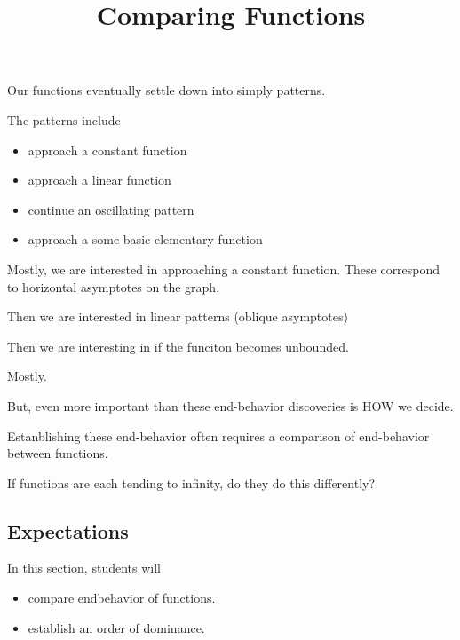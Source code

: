 \documentclass{ximera}
\title{Comparing Functions}
\begin{document}
\begin{abstract}
\end{abstract}
\maketitle







Our functions eventually settle down into simply patterns.  

The patterns include

\begin{itemize}
\item approach a constant function
\item approach a linear function
\item continue an oscillating pattern
\item approach a some basic elementary function 
\end{itemize}


Mostly, we are interested in approaching a constant function.  These correspond to horizontal asymptotes on the graph.

Then we are interested in linear patterns (oblique asymptotes)

Then we are interesting in if the funciton becomes unbounded.

Mostly.


But, even more important than these end-behavior discoveries is HOW we decide.

Estanblishing these end-behavior often requires a comparison of end-behavior between functions.  


If functions are each tending to infinity, do they do this differently?


















\subsection{Expectations}


\begin{sectionOutcomes}
In this section, students will 

\begin{itemize}
\item compare endbehavior of functions.
\item establish an order of dominance.
\end{itemize}
\end{sectionOutcomes}
\end{document}
